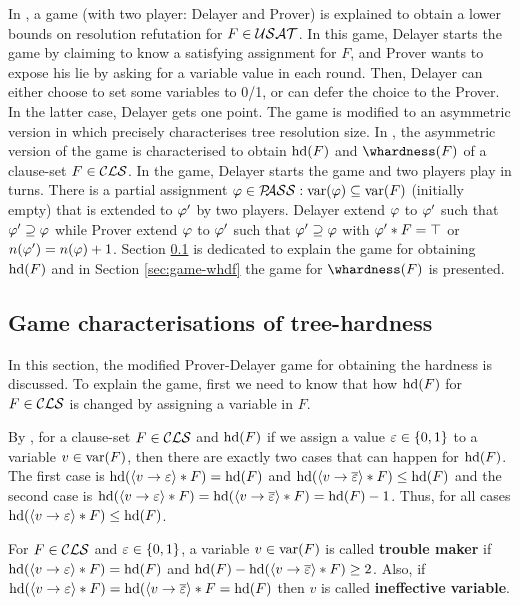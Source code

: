 \documentclass{report}
\begin{document}
In \cite{PI2000}, a game (with two player: Delayer and Prover) is explained to obtain a lower bounds on resolution refutation for $F \in \mathcal{USAT}$. In this game, Delayer starts the game by claiming to know a satisfying assignment for $F$, and Prover wants to expose his lie by asking for a variable value in each round. Then, Delayer can either choose to set some variables to 0/1, or can defer the choice to the Prover. In the latter case, Delayer gets one point. The game is modified to an asymmetric version in \cite{BGL13a} which precisely characterises tree resolution size. In \cite{BeyersdorffKullmann2014PHP,BeyersdorffGwynneKullmann2013PHPER}, the asymmetric version of the game is characterised to obtain $\operatorname{hd}(F)$ and $\whardness(F)$ of a clause-set $F \in \mathcal{CLS}$. In the game, Delayer starts the game and two players play in turns. There is a partial assignment $\varphi \in \mathcal{P\hspace{-0.32em}ASS}: \operatorname{var}(\varphi) \subseteq \operatorname{var}(F)$ (initially empty) that is extended to $\varphi'$ by two players. Delayer extend $\varphi$ to $\varphi'$ such that $\varphi' \supseteq \varphi$ while Prover extend $\varphi$ to $\varphi'$ such that $\varphi' \supseteq \varphi$ with $\varphi' * F= \top$ or $n(\varphi')=n(\varphi)+1$. Section \ref{sec:game-hdf} is dedicated to explain the game for obtaining $\operatorname{hd}(F)$ and in Section \ref{sec:game-whdf} the game for $\whardness(F)$ is presented.

\subsection{Game characterisations of tree-hardness}
\label{sec:game-hdf}

In this section, the modified Prover-Delayer game for obtaining the hardness is discussed. To explain the game, first we need to know that how $\operatorname{hd}(F)$ for $F \in \mathcal{CLS}$ is changed by assigning a variable in $F$. 

\begin{lem}\label{lem:hd-var}
By \cite{BeyersdorffKullmann2014PHP}, for a clause-set $F \in \mathcal{CLS}$ and $\operatorname{hd}(F)$ if we assign a value $\varepsilon \in \{ 0,1 \}$ to a variable $v \in \operatorname{var}(F)$, then there are exactly two cases that can happen for $\operatorname{hd}(F)$. The first case is $\operatorname{hd}(\langle v \rightarrow \varepsilon \rangle*F)=\operatorname{hd}(F)$ and $\operatorname{hd}(\langle v \rightarrow \overline {\varepsilon} \rangle*F) \leq \operatorname{hd}(F)$ and the second case is  $\operatorname{hd}(\langle v \rightarrow \varepsilon \rangle*F)=\operatorname{hd}(\langle v \rightarrow \overline {\varepsilon} \rangle*F)=\operatorname{hd}(F)-1$. Thus, for all cases  $\operatorname{hd}(\langle v \rightarrow \varepsilon \rangle*F) \leq \operatorname{hd}(F)$.
\end{lem}

\begin{defi}\label{def:var-trb}
For $F \in \mathcal{CLS}$ and  $\varepsilon \in \{ 0,1 \}$, a variable $v \in \operatorname{var}(F)$ is called \textbf{trouble maker} if $\operatorname{hd}(\langle v \rightarrow \varepsilon \rangle*F)=\operatorname{hd}(F)$ and $\operatorname{hd}(F)- \operatorname{hd}(\langle v \rightarrow \overline {\varepsilon} \rangle*F) \geq 2$. Also, if $\operatorname{hd}(\langle v \rightarrow \varepsilon \rangle*F)=\operatorname{hd}(\langle v \rightarrow \overline {\varepsilon} \rangle*F = \operatorname{hd}(F)$ then $v$ is called \textbf{ineffective variable}.
\end{defi}
\end{document}
